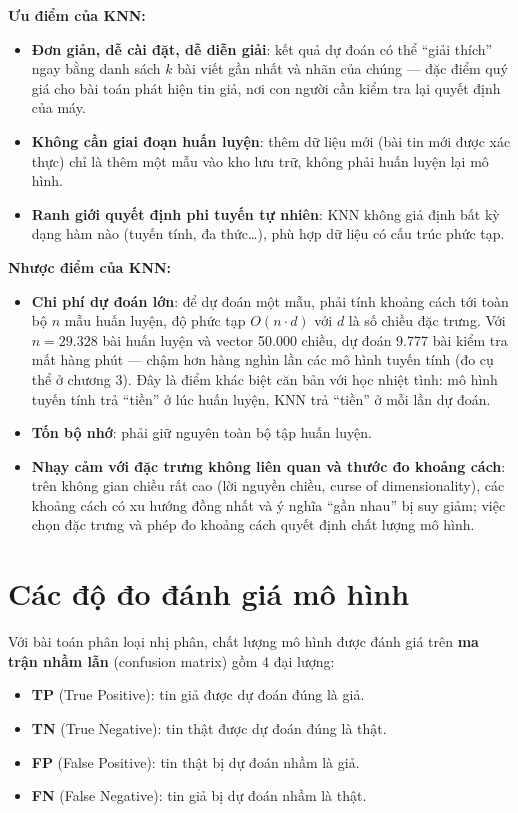 \textbf{Ưu điểm của KNN:}
\begin{itemize}
    \item \textbf{Đơn giản, dễ cài đặt, dễ diễn giải}: kết quả dự đoán có thể ``giải thích'' ngay bằng danh sách $k$ bài viết gần nhất và nhãn của chúng --- đặc điểm quý giá cho bài toán phát hiện tin giả, nơi con người cần kiểm tra lại quyết định của máy.
    \item \textbf{Không cần giai đoạn huấn luyện}: thêm dữ liệu mới (bài tin mới được xác thực) chỉ là thêm một mẫu vào kho lưu trữ, không phải huấn luyện lại mô hình.
    \item \textbf{Ranh giới quyết định phi tuyến tự nhiên}: KNN không giả định bất kỳ dạng hàm nào (tuyến tính, đa thức\ldots), phù hợp dữ liệu có cấu trúc phức tạp.
\end{itemize}

\textbf{Nhược điểm của KNN:}
\begin{itemize}
    \item \textbf{Chi phí dự đoán lớn}: để dự đoán một mẫu, phải tính khoảng cách tới toàn bộ $n$ mẫu huấn luyện, độ phức tạp $O(n \cdot d)$ với $d$ là số chiều đặc trưng. Với $n = 29.328$ bài huấn luyện và vector 50.000 chiều, dự đoán 9.777 bài kiểm tra mất hàng phút --- chậm hơn hàng nghìn lần các mô hình tuyến tính (đo cụ thể ở chương 3). Đây là điểm khác biệt căn bản với học nhiệt tình: mô hình tuyến tính trả ``tiền'' ở lúc huấn luyện, KNN trả ``tiền'' ở mỗi lần dự đoán.
    \item \textbf{Tốn bộ nhớ}: phải giữ nguyên toàn bộ tập huấn luyện.
    \item \textbf{Nhạy cảm với đặc trưng không liên quan và thước đo khoảng cách}: trên không gian chiều rất cao (lời nguyền chiều, curse of dimensionality), các khoảng cách có xu hướng đồng nhất và ý nghĩa ``gần nhau'' bị suy giảm; việc chọn đặc trưng và phép đo khoảng cách quyết định chất lượng mô hình.
\end{itemize}

\section{Các độ đo đánh giá mô hình}

Với bài toán phân loại nhị phân, chất lượng mô hình được đánh giá trên \textbf{ma trận nhầm lẫn} (confusion matrix) gồm 4 đại lượng:

\begin{itemize}
    \item \textbf{TP} (True Positive): tin giả được dự đoán đúng là giả.
    \item \textbf{TN} (True Negative): tin thật được dự đoán đúng là thật.
    \item \textbf{FP} (False Positive): tin thật bị dự đoán nhầm là giả.
    \item \textbf{FN} (False Negative): tin giả bị dự đoán nhầm là thật.
\end{itemize}

